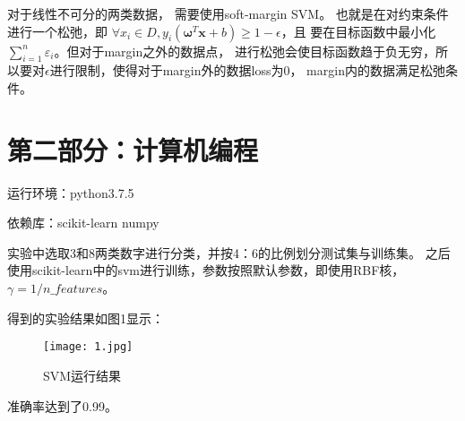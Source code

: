 \documentclass{article}
\begin{document}
对于线性不可分的两类数据，
需要使用soft-margin SVM。
也就是在对约束条件进行一个松弛，即
$\forall {x_i} \in D,{y_i}\left( {{\pmb{\omega} ^T}\pmb{x} + b} \right) \ge 1-\epsilon$，且
要在目标函数中最小化$\sum\limits_{i = 1}^n {\varepsilon _i}$。但对于margin之外的数据点，
进行松弛会使目标函数趋于负无穷，所以要对$\epsilon$进行限制，使得对于margin外的数据loss为0，
margin内的数据满足松弛条件。

\newpage
\section*{第二部分：计算机编程}
运行环境：python3.7.5

依赖库：scikit-learn numpy

实验中选取3和8两类数字进行分类，并按4：6的比例划分测试集与训练集。
之后使用scikit-learn中的svm进行训练，参数按照默认参数，即使用RBF核，
$\gamma = 1/n\_features$。

得到的实验结果如图1显示：
\begin{figure}[ht]
	\centering
	\texttt{[image: 1.jpg]}
	\caption{SVM运行结果}
	\label{figl}
\end{figure}

准确率达到了0.99。
\end{document}
